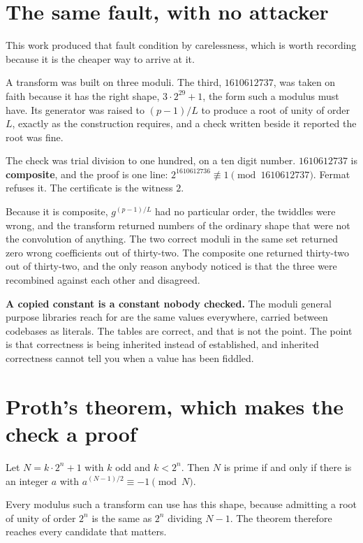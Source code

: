 \section{The same fault, with no attacker}

This work produced that fault condition by carelessness, which is worth recording because it is the cheaper way to arrive at it.

A transform was built on three moduli. The third, \(1610612737\), was taken on faith because it has the right shape, \(3 \cdot 2^{29} + 1\), the form such a modulus must have. Its generator was raised to \((p-1)/L\) to produce a root of unity of order \(L\), exactly as the construction requires, and a check written beside it reported the root was fine.

The check was trial division to one hundred, on a ten digit number. \(1610612737\) is \textbf{composite}, and the proof is one line: \(2^{1610612736} \not\equiv 1 \pmod{1610612737}\). Fermat refuses it. The certificate is the witness \(2\).

Because it is composite, \(g^{(p-1)/L}\) had no particular order, the twiddles were wrong, and the transform returned numbers of the ordinary shape that were not the convolution of anything. The two correct moduli in the same set returned zero wrong coefficients out of thirty-two. The composite one returned thirty-two out of thirty-two, and the only reason anybody noticed is that the three were recombined against each other and disagreed.

\textbf{A copied constant is a constant nobody checked.} The moduli general purpose libraries reach for are the same values everywhere, carried between codebases as literals. The tables are correct, and that is not the point. The point is that correctness is being inherited instead of established, and inherited correctness cannot tell you when a value has been fiddled.

\section{Proth's theorem, which makes the check a proof}

\begin{theorem}[Proth]
Let \(N = k \cdot 2^n + 1\) with \(k\) odd and \(k < 2^n\). Then \(N\) is prime if and only if there is an integer \(a\) with \(a^{(N-1)/2} \equiv -1 \pmod N\).
\end{theorem}

Every modulus such a transform can use has this shape, because admitting a root of unity of order \(2^n\) is the same as \(2^n\) dividing \(N-1\). The theorem therefore reaches every candidate that matters.

